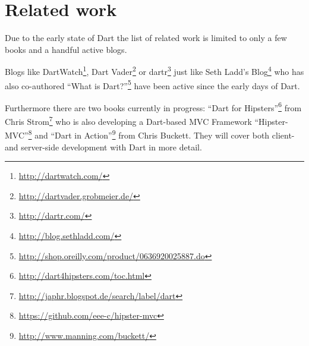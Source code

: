 \section{Related work}

Due to the early state of Dart the list of related work is limited to only a few books and a handful active blogs.

Blogs like DartWatch\footnote{\url{http://dartwatch.com/}}, Dart Vader\footnote{\url{http://dartvader.grobmeier.de/}} or dartr\footnote{\url{http://dartr.com/}} just like Seth Ladd's Blog\footnote{\url{http://blog.sethladd.com/}} who has also co-authored ``What is Dart?''\footnote{\url{http://shop.oreilly.com/product/0636920025887.do}} have been active since the early days of Dart.

Furthermore there are two books currently in progress: ``Dart for Hipsters''\footnote{\url{http://dart4hipsters.com/toc.html}} from Chris Strom\footnote{\url{http://japhr.blogspot.de/search/label/dart}} who is also developing a Dart-based MVC Framework ``Hipster-MVC''\footnote{\url{https://github.com/eee-c/hipster-mvc}} and ``Dart in Action''\footnote{\url{http://www.manning.com/buckett/}} from Chris Buckett. They will cover both client- and server-side development with Dart in more detail.